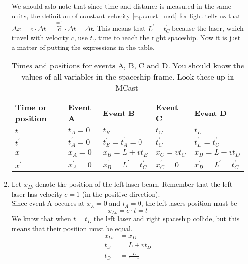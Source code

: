 \documentclass[a4paper,10pt,english]{article}
\begin{document}
\begin{enumerate}
We should aslo note that since time and distance is measured in the same units, the definition of constant velocity \ref{eq:const_mot} for light tells us that $\Delta x=v\cdot\Delta t=\overbrace{c}^{=1}\cdot\Delta t=\Delta t$. This means that $L^{\prime}=t_{C}^{\prime}$ because the laser, which travel with velocity $c$, use $t_{C}^{\prime}$ time to reach the right spaceship. Now it is just a matter of putting the expressions in the table.

\begin{table}[H]
  \begin{center}
    \begin{tabular}{| l | l | l | l | l |}
   	\hline
	 Time or position & Event A & Event B & Event C & Event D\\ \hline
	 $t$ & $t_{A}=0$ & $t_{B}$ & $t_{C}$ & $t_{D}$\\ \hline
	 $t^{\prime}$ & $t^{\prime}_{A}=0$ & $t_{B}^{\prime}=t^{\prime}_{A}=0$ & $t_{C}^{\prime}$ & $t^{\prime}_{D}=t^{\prime}_{C}$\\ \hline
	 $x$ & $x_{A}=0$ & $x_{B}=L+vt_{B}$ & $x_{C}=vt_{C}$ & $x_{D}=L+vt_{D}$\\ \hline
	 $x^{\prime}$ & $x^{\prime}_{A}=0$ & $x_{B}^{\prime}=L^{\prime}=t_{C}^{\prime}$ & $x_{C}^{\prime}=0$ & $x^{\prime}_{D}=L^{\prime}=t_{C}^{\prime}$\\ \hline
	\end{tabular}
    \caption{Times and positions for events A, B, C and D. You should know the values of all variables in the spaceship frame. Look these up in MCast.}
    \label{tabel:ex_2A_4}
  \end{center}
\end{table}
\FloatBarrier

\item Let $x_{Lb}$ denote the position of the left laser beam. Remember that the left laser has velocity $c=1$ (in the positive direction).
\\
Since event A occures at $x_{A}=0$ and $t_{A}=0$, the left lasers position must be 
\begin{equation}\label{eq:left_laser}x_{Lb}=c\cdot t=t\end{equation}
We know that when $t=t_{D}$ the left laser and right spaceship collide, but this means that their position must be equal.
\begin{align*}
x_{Lb}&=x_{D}\\
t_{D}&=L+vt_{D}\\
t_{D}&=\frac{L}{1-v}
\end{align*}


\end{enumerate}
\end{document}
